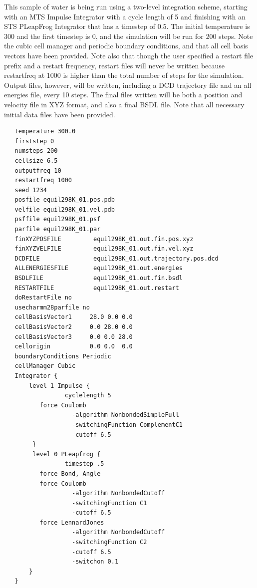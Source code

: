 \documentclass[11pt]{report}
\begin{document}
This sample of water is being run using a two-level integration scheme,
starting with an MTS Impulse Integrator with a cycle length of 5
and finishing with an STS PLeapFrog Integrator that has a timestep of
0.5.  The initial temperature is 300 and the first timestep is 0, and
the simulation will be run for 200 steps.  Note the cubic cell manager
and periodic boundary conditions, and that all cell basis vectors have
been provided.  Note also that though the user specified a restart
file prefix and a restart frequency, restart files will never be
written because restartfreq at 1000 is higher than the total number of
steps for the simulation.  Output files, however, will be written,
including a DCD trajectory file and an all energies file, every 10
steps.  The final files written will be both a position and velocity
file in XYZ format, and also a final BSDL file.  Note that all
necessary initial data files have been provided.
\clearpage
\begin{verbatim}        
   temperature 300.0 
   firststep 0
   numsteps 200
   cellsize 6.5
   outputfreq 10
   restartfreq 1000      
   seed 1234
   posfile equil298K_01.pos.pdb
   velfile equil298K_01.vel.pdb
   psffile equil298K_01.psf
   parfile equil298K_01.par
   finXYZPOSFILE         equil298K_01.out.fin.pos.xyz
   finXYZVELFILE         equil298K_01.out.fin.vel.xyz
   DCDFILE               equil298K_01.out.trajectory.pos.dcd
   ALLENERGIESFILE       equil298K_01.out.energies
   BSDLFILE              equil298K_01.out.fin.bsdl
   RESTARTFILE           equil298K_01.out.restart
   doRestartFile no
   usecharmm28parfile no
   cellBasisVector1     28.0 0.0 0.0
   cellBasisVector2     0.0 28.0 0.0
   cellBasisVector3     0.0 0.0 28.0
   cellorigin           0.0 0.0  0.0
   boundaryConditions Periodic
   cellManager Cubic
   Integrator {
       level 1 Impulse {
                 cyclelength 5
          force Coulomb
                   -algorithm NonbondedSimpleFull
                   -switchingFunction ComplementC1
                   -cutoff 6.5
        }
        level 0 PLeapfrog {
                 timestep .5
          force Bond, Angle 
          force Coulomb
                   -algorithm NonbondedCutoff
                   -switchingFunction C1
                   -cutoff 6.5
          force LennardJones
                   -algorithm NonbondedCutoff    
                   -switchingFunction C2
                   -cutoff 6.5
                   -switchon 0.1
       }
   }
\end{verbatim}        
\clearpage
\end{document}
